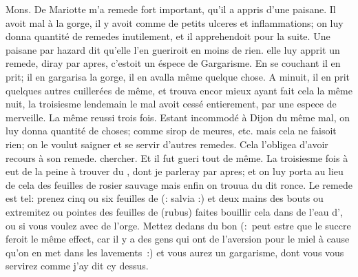 Mons. De Mariotte\protect{} m'a  remede fort important, qu'il a appris d'une paisane. Il avoit mal \`{a} la gorge, il y avoit comme de petits ulceres et inflammations; on luy donna quantit\'{e} de remedes inutilement, et il apprehendoit pour la suite. Une paisane par hazard dit qu'elle l'en gueriroit en moins de rien.  elle luy apprit un remede,  diray par apres, c'estoit un \'{e}spece de Gargarisme. En se couchant il en prit; il en gargarisa la gorge, il en avalla m\^{e}me quelque chose. A minuit, il en prit quelques autres cuiller\'{e}es de m\^{e}me, et  trouva encor mieux ayant fait cela la m\^{e}me nuit, la troisiesme  lendemain le mal avoit cess\'{e} entierement, par une espece de merveille. La m\^{e}me  reussi trois fois. Estant incommod\'{e} \`{a} Dijon\protect{}
 du m\^{e}me mal, on luy donna quantit\'{e} de choses; comme sirop de meures, etc. mais cela ne faisoit rien; on le voulut saigner et se servir d'autres remedes. Cela l'obligea d'avoir recours \`{a} son remede.  chercher. Et il fut gueri tout de m\^{e}me. La troisiesme fois \`{a}  eut de la peine \`{a} trouver du , dont je parleray par apres; et on luy porta au lieu de cela des feuilles de rosier sauvage mais enfin on trouua du dit ronce.
\pend%
\pstart%
Le remede est tel: prenez cinq ou six feuilles de  (: salvia :) et deux mains des bouts ou extremitez ou pointes des feuilles de  (rubus) faites bouillir cela dans de l'eau d', ou si vous voulez avec de l'orge. Mettez dedans du bon \protect{} (:~peut estre que le succre feroit le m\^{e}me effect, car il y a des gens qui ont de l'aversion pour le miel \`{a} cause qu'on en met dans les lavements~:) et vous aurez un gargarisme, dont vous vous servirez comme j'ay dit cy dessus.
\pend%
\count{}
\count{}
\count{}
